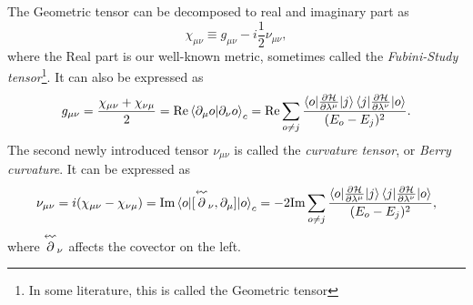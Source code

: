 The Geometric tensor can be decomposed to  real and imaginary part as
\begin{equation}
    \chi_{\mu\nu} \equiv g_{\mu\nu} - i\frac{1}{2} \nu_{\mu\nu},
\end{equation}
where the Real part is our well-known metric, sometimes called the \emph{Fubini-Study tensor}\footnote{In some literature, this is called the Geometric tensor}. It can also be expressed as
\begin{equation}
    g_{\mu\nu} = \frac{\chi_{\mu\nu}+\chi_{\nu\mu}}{2} = \text{Re}\braket{\partial_\mu o|\partial_\nu o}_c = \text{Re} \sum_{o\neq j}\frac{\braket{o|\frac{\partial \mathcal{H}}{\partial \lambda^\mu}|j}\braket{j|\frac{\partial \mathcal{H}}{\partial \lambda^\nu}|o}}{(E_o-E_j)^2}.
    \label{eq:metrictensorREdefinition}
\end{equation}
The second newly introduced tensor $\nu_{\mu\nu}$ is called the \emph{curvature tensor}, or \emph{Berry curvature}. It can be expressed as
\begin{equation}
        \nu_{\mu\nu} = i(\chi_{\mu\nu}-\chi_{\nu\mu})= \Im\braket{o|[\curlyleftarrow{\partial}_\nu,\partial_\mu]|o}_c = -2 \Im \sum_{o\neq j}\frac{\braket{o|\pder{\H}{\lambda^\mu}|j}\braket{j|\pder{\H}{\lambda^\nu}|o}}{(E_o-E_j)^2},
    \label{eq:geom.tensorREdefinition}
\end{equation}
where $\curlyleftarrow{\partial}_\nu$ affects the covector on the left.




